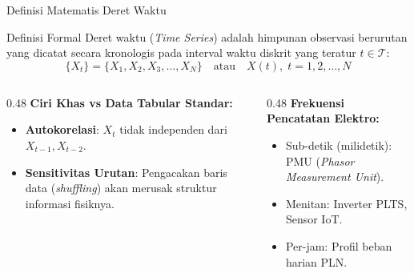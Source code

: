 \documentclass[aspectratio=169, 10pt]{beamer}
\begin{document}
\begin{frame}{Definisi Matematis Deret Waktu}
    \begin{block}{Definisi Formal}
        Deret waktu (\textit{Time Series}) adalah himpunan observasi berurutan yang dicatat secara kronologis pada interval waktu diskrit yang teratur $t \in \mathcal{T}$:
        \begin{equation}
            \{X_t\} = \{X_1, X_2, X_3, \dots, X_N\} \quad \text{atau} \quad X(t), \; t = 1, 2, \dots, N
        \end{equation}
    \end{block}

    \vspace{0.2cm}
    \begin{columns}[T]
        \begin{column}{0.48\textwidth}
            \textbf{Ciri Khas vs Data Tabular Standar:}
            \begin{itemize}
                \item \textbf{Autokorelasi}: $X_t$ tidak independen dari $X_{t-1}, X_{t-2}$.
                \item \textbf{Sensitivitas Urutan}: Pengacakan baris data (\textit{shuffling}) akan merusak struktur informasi fisiknya.
            \end{itemize}
        \end{column}
        \begin{column}{0.48\textwidth}
            \textbf{Frekuensi Pencatatan Elektro:}
            \begin{itemize}
                \item Sub-detik (milidetik): PMU (\textit{Phasor Measurement Unit}).
                \item Menitan: Inverter PLTS, Sensor IoT.
                \item Per-jam: Profil beban harian PLN.
            \end{itemize}
        \end{column}
    \end{columns}
\end{frame}
\end{document}
